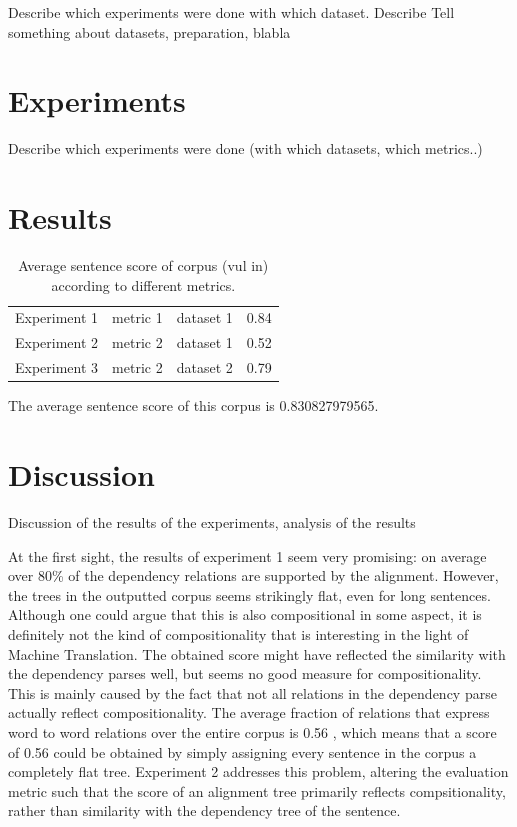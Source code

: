 \documentclass{report}
\theoremstyle{definition}
\theoremstyle{plain}
\begin{document}
Describe which experiments were done with which dataset. Describe
Tell something about datasets, preparation, blabla

\section{Experiments}

Describe which experiments were done (with which datasets, which metrics..)

\section{Results}

\begin{table}\label{table:scores}
\begin{tabular}{llll}
Experiment 1 & metric 1 & dataset 1 & 0.84\\
Experiment 2 & metric 2 & dataset 1 & 0.52\\
Experiment 3 & metric 2 & dataset 2 & 0.79\\
\end{tabular}
\caption{Average sentence score of corpus (vul in) according to different metrics.}
\end{table}


The average sentence score of this corpus is 0.830827979565.

\section{Discussion}

Discussion of the results of the experiments, analysis of the results

At the first sight, the results of experiment 1 seem very promising: on average over 80\% of the dependency relations are supported by the alignment. However, the trees in the outputted corpus seems strikingly flat, even for long sentences. Although one could argue that this is also compositional in some aspect, it is definitely not the kind of compositionality that is interesting in the light of Machine Translation. The obtained score might have reflected the similarity with the dependency parses well, but seems no good measure for compositionality. This is mainly caused by the fact that not all relations in the dependency parse actually reflect compositionality. The average fraction of relations that express word to word relations over the entire corpus is 0.56 %
, which means that a score of 0.56 could be obtained by simply assigning every sentence in the corpus a completely flat tree. Experiment 2 addresses this problem, altering the evaluation metric such that the score of an alignment tree primarily reflects compsitionality, rather than similarity with the dependency tree of the sentence.
\end{document}

